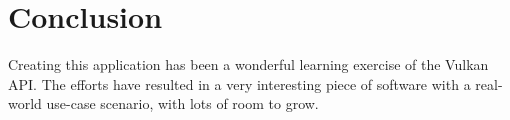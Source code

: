 \section{Conclusion}
Creating this application has been a wonderful learning exercise of the Vulkan API. The efforts have resulted in a very interesting piece of software with a real-world use-case scenario, with lots of room to grow.
